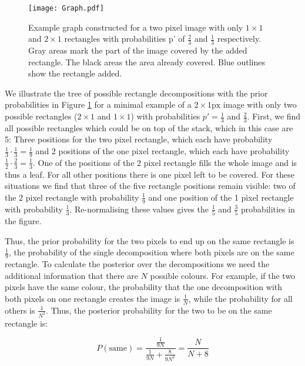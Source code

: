 \documentclass[10pt,letterpaper]{article}
\begin{document}
\begin{figure}
\begin{center}
\texttt{[image: Graph.pdf]}
\end{center}
\caption{Example graph constructed for a two pixel image with only $1\times1$ and $2\times1$ rectangles with probabilities p' of $\frac{2}{3}$ and $\frac{1}{3}$ respectively. Gray areas mark the part of the image covered by the added rectangle. The black areas the area already covered. Blue outlines show the rectangle added.
\label{fig:graph}}
\end{figure}

We illustrate the tree of possible rectangle decompositions with the prior probabilities in Figure \ref{fig:graph} for a minimal example of a $2\times1\mathrm{px}$ image with only two possible rectangles ($2\times1$ and $1\times1$) with probabilities $p'=\frac{1}{3}$ and $\frac{2}{3}$. First, we find all possible rectangles which could be on top of the stack, which in this case are 5: Three positions for the two pixel rectangle, which each have probability $\frac{1}{3}\cdot \frac{1}{3}=\frac{1}{9}$ and 2 positions of the one pixel rectangle, which each have probability $\frac{1}{2}\cdot \frac{2}{3}=\frac{1}{3}$. One of the positions of the 2 pixel rectangle fills the whole image and is thus a leaf. For all other positions there is one pixel left to be covered. For these situations we find that three of the five rectangle positions remain visible: two of the 2 pixel rectangle with probability $\frac{1}{9}$ and one position of the 1 pixel rectangle with probability $\frac{1}{3}$. Re-normalising these values gives the $\frac{1}{5}$ and $\frac{3}{5}$ probabilities in the figure. 

Thus, the prior probability for the two pixels to end up on the same rectangle is $\frac{1}{9}$, the probability of the single decomposition where both pixels are on the same rectangle. To calculate the posterior over the decompositions we need the additional information that there are $N$ possible colours. For example, if the two pixels have the same colour, the probability that the one decomposition with both pixels on one rectangle creates the image is $\frac{1}{N}$, while the probability for all others is $\frac{1}{N^2}$. Thus, the posterior probability for the two to be on the same rectangle is:

\begin{equation}
    P(\mathrm{same}) = \frac{\frac{1}{9N}}{\frac{1}{9N}+\frac{8}{9N^2}} =\frac{N}{N+8}
\end{equation}
\end{document}
